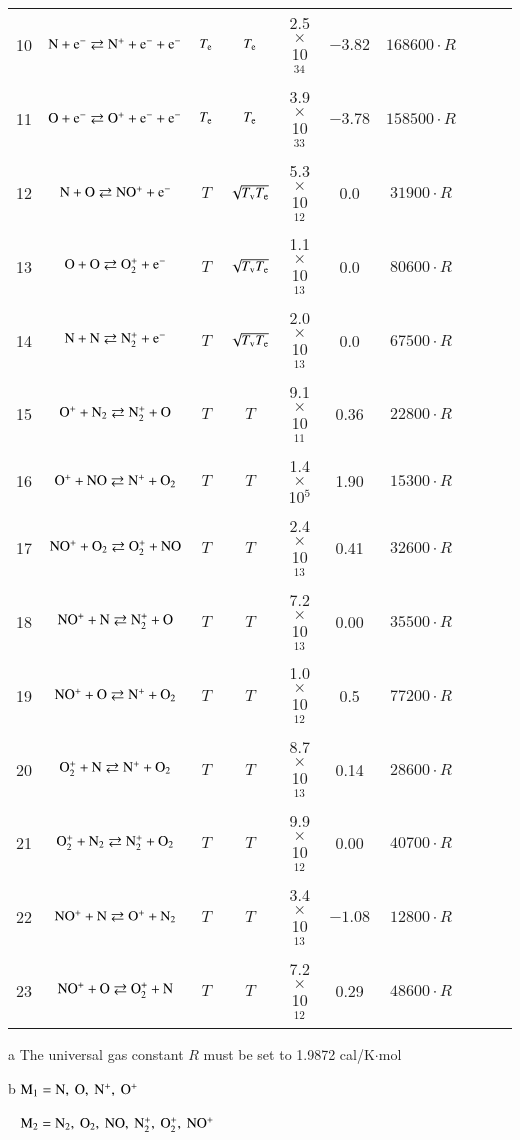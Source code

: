 \documentclass{warpdoc}
\begin{document}
\begin{table}[t]
\begin{center}
\begin{threeparttable}
\begin{tabular}{cccccccccc}
10 & $\rm N + e^- \rightleftarrows N^+ + e^- + e^- $ & $T_{\rm e}$ & $T_{\rm e}$ & 2.5 $\times$ 10$^{34}$  & $-3.82$ & $168600 \cdot R$ & \cite{book:1990:park}\\
11 & $\rm O + e^- \rightleftarrows O^+ + e^- + e^- $ & $T_{\rm e}$ & $T_{\rm e}$ & 3.9 $\times$ 10$^{33}$  & $-3.78$ & $158500 \cdot R$ & \cite{book:1990:park}\\
12 & $\rm N + O \rightleftarrows NO^+ + e^- $ & $T$ & $\sqrt{T_{\rm v} T_{\rm e}}$ & 5.3 $\times$ 10$^{12}$  & 0.0 & $31900 \cdot R$ & \cite{pf:2007:boyd}\\
13 & $\rm O + O \rightleftarrows O_2^+ + e^- $ & $T$ & $\sqrt{T_{\rm v} T_{\rm e}}$ & 1.1 $\times$ 10$^{13}$  & 0.0 & $80600 \cdot R$ & \cite{pf:2007:boyd}\\
14 & $\rm N + N \rightleftarrows N_2^+ + e^- $ & $T$ & $\sqrt{T_{\rm v} T_{\rm e}}$ & 2.0 $\times$ 10$^{13}$  & 0.0 & $67500 \cdot R$ & \cite{pf:2007:boyd}\\
15 & $\rm O^+ + N_2 \rightleftarrows N_2^+ + O $ & $T$ & $T$ & 9.1 $\times$ 10$^{11}$  & 0.36 & $22800 \cdot R$ & \cite{book:1990:park}\\
16 & $\rm O^+ + NO \rightleftarrows N^+ + O_2 $ & $T$ & $T$ & 1.4 $\times$ 10$^{5}$  & 1.90 & $15300 \cdot R$ & \cite{book:1990:park,jtht:2013:farbar}\\
17 & $\rm NO^+ + O_2 \rightleftarrows O_2^+ + NO $ & $T$ & $T$ & 2.4 $\times$ 10$^{13}$  & 0.41 & $32600 \cdot R$ & \cite{book:1990:park}\\
18 & $\rm NO^+ + N \rightleftarrows N_2^+ + O $ & $T$ & $T$ & 7.2 $\times$ 10$^{13}$  & 0.00 & $35500 \cdot R$ & \cite{book:1990:park}\\
19 & $\rm NO^+ + O \rightleftarrows N^+ + O_2 $ & $T$ & $T$ & 1.0 $\times$ 10$^{12}$  & 0.5 & $77200 \cdot R$ & \cite{book:1990:park}\\
20 & $\rm O_2^+ + N \rightleftarrows N^+ + O_2 $ & $T$ & $T$ & 8.7 $\times$ 10$^{13}$  & 0.14 & $28600 \cdot R$ & \cite{book:1990:park}\\
21 & $\rm O_2^+ + N_2 \rightleftarrows N_2^+ + O_2 $ & $T$ & $T$ & 9.9 $\times$ 10$^{12}$  & 0.00 & $40700 \cdot R$ & \cite{book:1990:park}\\
22 & $\rm NO^+ + N \rightleftarrows O^+ + N_2 $ & $T$ & $T$ & 3.4 $\times$ 10$^{13}$  & $-1.08$ & $12800 \cdot R$ & \cite{book:1990:park}\\
23 & $\rm NO^+ + O \rightleftarrows O_2^+ + N $ & $T$ & $T$ & 7.2 $\times$ 10$^{12}$  & 0.29 & $48600 \cdot R$ & \cite{book:1990:park}\\
\bottomrule
\end{tabular}
\begin{tablenotes}
\item[{a}] The universal gas constant $R$ must be set to 1.9872	cal/K$\cdot$mol 
\item[{b}] $\rm M_1=N,~O,~N^+,~O^+$
\item[~] $\rm M_2=N_2,~O_2,~NO,~N_2^+,~O_2^+,~NO^+$
\end{tablenotes}
\label{tab:farbar}
\end{threeparttable}
\end{center}
\end{table}
\end{document}
